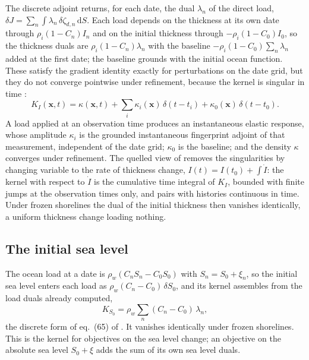\documentclass[11pt,a4paper]{article}
\newcommand{\dd}{\mathrm{d}}
\newcommand{\x}{\mathbf{x}}
\numberwithin{equation}{section}
\begin{document}
The discrete adjoint returns, for each date, the dual $\lambda_{n}$ of the direct
load, $\delta J = \sum_{n}\int\lambda_{n}\,\delta\zeta_{d,n}\,\dd S$. Each load
depends on the thickness at its own date through $\rho_{i}(1-C_{n})I_{n}$ and on
the initial thickness through $-\rho_{i}(1-C_{0})I_{0}$, so the thickness duals
are $\rho_{i}(1-C_{n})\lambda_{n}$ with the baseline
$-\rho_{i}(1-C_{0})\sum_{n}\lambda_{n}$ added at the first date; the baseline
grounds with the initial ocean function. These satisfy the gradient identity
exactly for perturbations on the date grid, but they do not converge pointwise
under refinement, because the kernel is singular in time
\citep[eq.~81]{YuEtAl2025}:
\begin{equation}
K_{I}(\x,t) = \kappa(\x,t) + \sum_{i}\kappa_{i}(\x)\,\delta(t-t_{i})
 + \kappa_{0}(\x)\,\delta(t-t_{0}).
\end{equation}
A load applied at an observation time produces an instantaneous elastic
response, whose amplitude $\kappa_{i}$ is the grounded instantaneous fingerprint
adjoint of that measurement, independent of the date grid; $\kappa_{0}$ is the
baseline; and the density $\kappa$ converges under refinement. The quelled view
of \citet{Backus1970} removes the singularities by changing variable to the
rate of thickness change, $I(t) = I(t_{0}) + \int\dot I$: the kernel with respect
to $\dot I$ is the cumulative time integral of $K_{I}$, bounded with finite jumps
at the observation times only, and pairs with histories continuous in time.
Under frozen shorelines the dual of the initial thickness then vanishes
identically, a uniform thickness change loading nothing.

\subsection{The initial sea level}

The ocean load at a date is $\rho_{w}(C_{n}S_{n} - C_{0}S_{0})$ with
$S_{n} = S_{0} + \xi_{n}$, so the initial sea level enters each load as
$\rho_{w}(C_{n}-C_{0})\,\delta S_{0}$, and its kernel assembles from the load
duals already computed,
\begin{equation}
K_{S_{0}} = \rho_{w}\sum_{n}(C_{n}-C_{0})\,\lambda_{n},
\label{eq:ksl0}
\end{equation}
the discrete form of eq.~(65) of \citet{YuEtAl2025}. It vanishes identically
under frozen shorelines. This is the kernel for objectives on the sea level
change; an objective on the absolute sea level $S_{0}+\xi$ adds the sum of its
own sea level duals.
\end{document}
